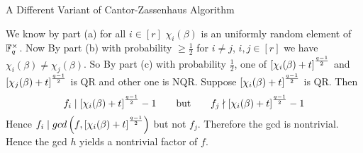 \documentclass[a4paper, 11pt]{article}
\begin{document}
{\begin{enumerate}[label=(\alph*)]
	\begin{algorithm}[H]
		\caption{A Different Variant of Cantor-Zassenhaus Algorithm}
		\end{algorithm}
		
		We know by part (a) for all $i\in[r]$ $\chi_i(\beta)$ is an uniformly random element of $\mathbb{F}_q^{\times}$. Now By part (b) with probability $\geq \frac12$ for $i\neq j$, $i,j\in[r]$ we have $\chi_i(\beta)\neq \chi_j(\beta)$. So By part (c) with probability $\frac12$, one of $\left[\chi_i(\beta)+t\right]^{\frac{q-1}2}$ and $\left[\chi_j(\beta)+t\right]^{\frac{q-1}2}$ is QR and other one is NQR. Suppose $\left[\chi_i(\beta)+t\right]^{\frac{q-1}2}$ is QR. Then $$f_i\mid \left[\chi_i(\beta)+t\right]^{\frac{q-1}2}-1\qquad\text{but}\qquad f_j\nmid \left[\chi_i(\beta)+t\right]^{\frac{q-1}2}-1$$Hence $f_i\mid gcd\left(f,\left[\chi_i(\beta)+t\right]^{\frac{q-1}2}  \right)$ but not $f_j$. Therefore the gcd is nontrivial. Hence the gcd $h$ yields a nontrivial factor of $f$.
		
\end{enumerate}
}

\end{document}
